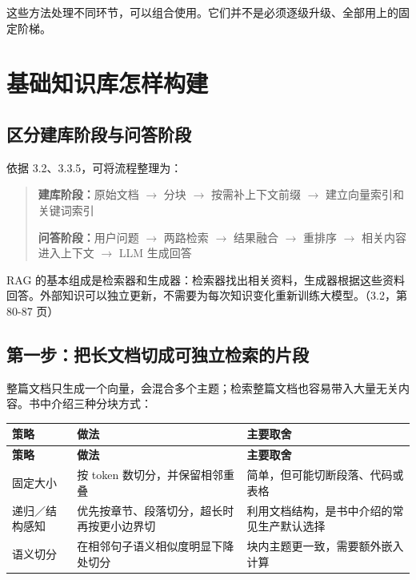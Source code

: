 \documentclass[UTF8,a4paper,11pt]{ctexart}
\newlength{\tableusable}
\begin{document}
这些方法处理不同环节，可以组合使用。它们并不是必须逐级升级、全部用上的固定阶梯。

\section{基础知识库怎样构建}

\subsection{区分建库阶段与问答阶段}

依据 3.2、3.3.5，可将流程整理为：

\begin{quote}\small
\textbf{建库阶段：}原始文档 \(\rightarrow\) 分块 \(\rightarrow\) 按需补上下文前缀 \(\rightarrow\) 建立向量索引和关键词索引


\textbf{问答阶段：}用户问题 \(\rightarrow\) 两路检索 \(\rightarrow\) 结果融合 \(\rightarrow\) 重排序 \(\rightarrow\) 相关内容进入上下文 \(\rightarrow\) LLM 生成回答


\end{quote}

RAG 的基本组成是检索器和生成器：检索器找出相关资料，生成器根据这些资料回答。外部知识可以独立更新，不需要为每次知识变化重新训练大模型。（3.2，第 80-87 页）

\subsection{第一步：把长文档切成可独立检索的片段}

整篇文档只生成一个向量，会混合多个主题；检索整篇文档也容易带入大量无关内容。书中介绍三种分块方式：

\begingroup\small
\setlength{\tableusable}{\dimexpr\linewidth-4\tabcolsep\relax}
\begin{longtable}{@{}>{\raggedright\arraybackslash}p{0.2\tableusable}>{\raggedright\arraybackslash}p{0.36\tableusable}>{\raggedright\arraybackslash}p{0.44\tableusable}@{}}
\toprule
\textbf{策略} & \textbf{做法} & \textbf{主要取舍} \\
\midrule\endfirsthead
\toprule
\textbf{策略} & \textbf{做法} & \textbf{主要取舍} \\
\midrule\endhead
\bottomrule\endfoot
固定大小 & 按 token 数切分，并保留相邻重叠 & 简单，但可能切断段落、代码或表格 \\
递归／结构感知 & 优先按章节、段落切分，超长时再按更小边界切 & 利用文档结构，是书中介绍的常见生产默认选择 \\
语义切分 & 在相邻句子语义相似度明显下降处切分 & 块内主题更一致，需要额外嵌入计算 \\
\end{longtable}\endgroup
\end{document}
